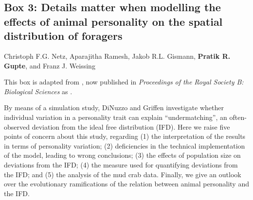 
\begin{refsection}
\newrefcontext[sorting=ynt]
\pagestyle{plain}
\pagecolor{Snow2}

	\medskip
	\section*{Box 3: Details matter when modelling the
    effects of animal personality on the
    spatial distribution of foragers}\label{box:details}

	\medskip

	\noindent Christoph F.G. Netz, Aparajitha Ramesh, Jakob R.L. Gismann, \textbf{Pratik R. Gupte}, and Franz J. Weissing

	\medskip

	\noindent {\large{$\Delta$}} \small{This box is adapted from \citet{netz2022}, now published in \textit{Proceedings of the Royal Society B: Biological Sciences} as .}

	\medskip

	By means of a simulation study, DiNuzzo and Griffen \citep{dinuzzo2020} investigate whether individual variation in a personality trait can explain ``undermatching'', an often-observed deviation from the ideal free distribution (IFD). Here we raise five points of concern about this study, regarding (1) the interpretation of the results in terms of personality variation; (2) deficiencies in the technical implementation of the model, leading to wrong conclusions; (3) the effects of population size on deviations from the IFD; (4) the measure used for quantifying deviations from the IFD; and (5) the analysis of the mud crab data. Finally, we give an outlook over the evolutionary ramifications of the relation between animal personality and the IFD.
	

\end{refsection}
